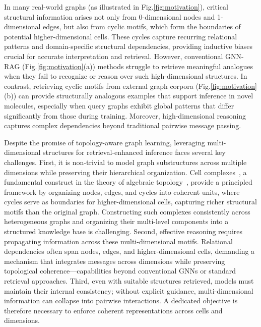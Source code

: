 In many real-world graphs (as illustrated in Fig.\ref{fig:motivation}), critical structural information arises not only from 0-dimensional nodes and 1-dimensional edges, but also from cyclic motifs, which form the boundaries of potential higher-dimensional cells. %
These cycles capture recurring relational patterns and domain-specific structural dependencies, providing inductive biases crucial for accurate interpretation and retrieval. However, conventional GNN-RAG (Fig.\ref{fig:motivation}(a)) methods struggle to retrieve meaningful analogues when they fail to recognize or reason over such high-dimensional structures. In contrast, retrieving cyclic motifs from external graph corpora (Fig.\ref{fig:motivation}(b)) can provide structurally analogous examples that support inference in novel molecules, especially when query graphs exhibit global patterns that differ significantly from those during training.
 Moreover, high-dimensional reasoning captures complex dependencies beyond traditional pairwise message passing.

Despite the promise of topology-aware graph learning, leveraging multi-dimensional structures for retrieval-enhanced inference faces several key challenges. First, it is non-trivial to model graph substructures across multiple dimensions while preserving their hierarchical organization. Cell complexes~\cite{DBLP:conf/nips/BodnarFOWLMB21}, a fundamental construct in the theory of algebraic topology~\cite{hatcher_book},  provide a principled framework by organizing nodes, edges, and cycles into coherent units, where cycles serve as boundaries for higher-dimensional cells, capturing richer structural motifs than the original graph. Constructing such complexes consistently across heterogeneous graphs and organizing their multi-level components into a structured knowledge base is challenging. Second, effective reasoning requires propagating information across these multi-dimensional motifs. Relational dependencies often span nodes, edges, and higher-dimensional cells, demanding a mechanism that integrates messages across dimensions while preserving topological coherence—capabilities beyond conventional GNNs or standard retrieval approaches. Third, even with suitable structures retrieved, models must maintain their internal consistency; without explicit guidance, multi-dimensional information can collapse into pairwise interactions. A dedicated objective is therefore necessary to enforce coherent representations across cells and dimensions. 


